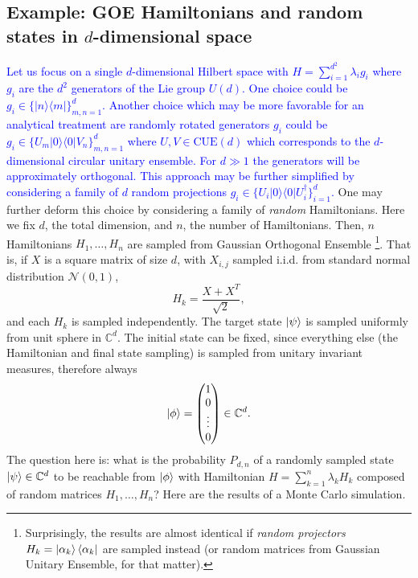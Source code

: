 \documentclass[ a4paper, 
                amsfonts, 
                amssymb, 
                amsmath, 
                reprint, 
                showkeys, 
                nofootinbib,
                superscriptaddress, 
                onecolumn, 
                notitlepage,
                aps,
                pra,
                longbibliography]{revtex4-1}
\newcommand{\yu}[1]{\textcolor{blue}{#1}}
\theoremstyle{definition}
\begin{document}
\subsection{Example: GOE Hamiltonians and random states in $d$-dimensional space}
\yu{Let us focus on a single $d$-dimensional Hilbert space with $H = \sum_{i=1}^{d^2} 
\lambda_i g_i$ where $g_i$ are the $d^2$ generators of the Lie group $U(d)$. 
One choice could be $g_i \in \{ \vert n \rangle \langle m \vert \}_{m,n=1}^{d}$.
Another choice which may be more favorable for an analytical treatment are randomly rotated generators $g_i$ could be $g_i \in \{ U_m \vert 0 \rangle \langle 0 \vert V_n\}_{m,n=1}^d$ where $U,V \in \mathrm{CUE}(d)$ which corresponds to the $d$-dimensional circular unitary ensemble. For $d \gg 1$ the generators will be approximately orthogonal. This approach may be further simplified by considering a family of $d$ random projections $g_i \in \{ U_i\vert 0 \rangle \langle 0\vert U_i^\dagger \}_{i=1}^d $.
}
One may further deform this choice by considering a family of \emph{random} Hamiltonians. Here we fix $d$, the total dimension, and $n$, the number of Hamiltonians. Then, $n$ Hamiltonians $H_1, \ldots, H_n$ are sampled from Gaussian Orthogonal Ensemble \footnote{Surprisingly, the results are almost identical if \emph{random projectors} $H_k=\ket{\alpha_k}\bra{\alpha_k}$ are sampled instead (or random matrices from Gaussian Unitary Ensemble, for that matter).}. That is, if $X$ is a square matrix of size $d$, with $X_{i,j}$ sampled i.i.d. from standard normal distribution $\mathcal{N}(0,1)$, 
\begin{equation}H_k = \frac{X+X^T}{\sqrt{2}},\end{equation}
and each $H_k$ is sampled independently. The target state $\ket\psi$ is sampled uniformly from unit sphere in $\mathbb{C}^d$. The initial state can be fixed, since everything else (the Hamiltonian and final state sampling) is sampled from unitary invariant measures, therefore always
\begin{equation}
\ket\phi = \begin{pmatrix} 1\\0\\\vdots\\0\end{pmatrix} \in\mathbb{C}^d.
\end{equation}
The question here is: what is the probability $P_{d,n}$ of a randomly sampled state $\ket\psi\in\mathbb{C}^d$ {to be reachable from $\ket\phi$ with Hamiltonian $H=\sum_{k=1}^n \lambda_k H_k$ composed of random matrices} $H_1, \ldots, H_n$? Here are the results of a Monte Carlo simulation.
\end{document}
